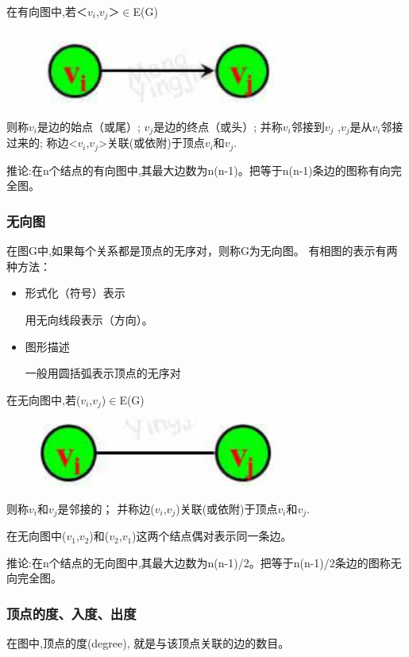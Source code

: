 \documentclass[AutoFakeBold]{LZUThesis2007}
\begin{document}
在有向图中,若＜$v_{i}$,$v_{j}$＞$\in$E(G)
\begin{figure}[H]
    \centering
    \includegraphics[width=0.7\textwidth]{figures/8.3.png}

\end{figure}
则称$v_{i}$是边的始点（或尾）; $v_{j}$是边的终点（或头）; 并称$v_{i}$邻接到$v_{j}$ ,$v_{j}$是从$v_{i}$邻接过来的; 称边<$v_{i}$,$v_{j}$>关联(或依附)于顶点$v_{i}$和$v_{j}$.

推论:在n个结点的有向图中,其最大边数为n(n-1)。把等于n(n-1)条边的图称有向完全图。

			\subsubsection{无向图}
在图G中,如果每个关系都是顶点的无序对，则称G为无向图。
有相图的表示有两种方法：
	\begin{itemize}
		\item 形式化（符号）表示
	
	用无向线段表示（方向）。
		\item 图形描述
	
	一般用圆括弧表示顶点的无序对
	\end{itemize}

在无向图中,若($v_{i}$,$v_{j}$)$\in$E(G)
\begin{figure}[H]
    \centering
    \includegraphics[width=0.7\textwidth]{figures/8.4.png}

\end{figure}
则称$v_{i}$和$v_{j}$是邻接的； 并称边($v_{i}$,$v_{j}$)关联(或依附)于顶点$v_{i}$和$v_{j}$.

在无向图中($v_{1}$,$v_{2}$)和($v_{2}$,$v_{1}$)这两个结点偶对表示同一条边。

推论:在n个结点的无向图中,其最大边数为n(n-1)/2。把等于n(n-1)/2条边的图称无向完全图。

			\subsubsection{顶点的度、入度、出度}
在图中,顶点的度(degree), 就是与该顶点关联的边的数目。
\end{document}

